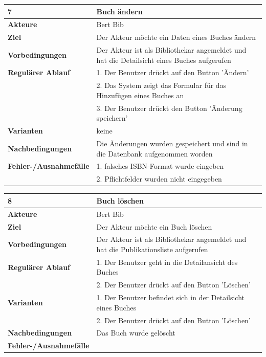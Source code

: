 \documentclass[fontsize=12pt,paper=a4,twoside]{scrartcl}
\begin{document}
\begin{table}[htbp]
\label{7}
\begin{tabular}{|l|p{10cm}|}
\hline 
\textbf{7} & \textbf{Buch ändern} \\ \hline
\textbf{Akteure} & Bert Bib\\ \hline
\textbf{Ziel} & Der Akteur möchte ein Daten eines Buches ändern \\ \hline
\textbf{Vorbedingungen} & Der Akteur ist als Bibliothekar angemeldet und hat die Detailsicht eines 
Buches aufgerufen  \\ \hline
\textbf{Regulärer Ablauf} & 
1. Der Benutzer drückt auf den Button 'Ändern' \\
&2. Das System zeigt das Formular für das Hinzufügen eines Buches an\\
&3. Der Benutzer drückt den Button 'Änderung speichern'\\
\hline
\textbf{Varianten} & 
keine \\ \hline
\textbf{Nachbedingungen} & Die Änderungen wurden gespeichert und sind in die Datenbank 
aufgenommen worden\\ \hline
\textbf{Fehler-/Ausnahmefälle} & 1. falsches ISBN-Format wurde eingeben\\
&2. Pflichtfelder wurden nicht eingegeben\\
\hline
\end{tabular}
\end{table}



\begin{table}[htbp]
\label{8}
\begin{tabular}{|l|p{10cm}|}
\hline 
\textbf{8} & \textbf{Buch löschen} \\ \hline
\textbf{Akteure} & Bert Bib\\ \hline
\textbf{Ziel} & Der Akteur möchte ein Buch löschen \\ \hline
\textbf{Vorbedingungen} & Der Akteur ist als Bibliothekar angemeldet und hat die Publikationsliste 
aufgerufen  \\ \hline
\textbf{Regulärer Ablauf} & 
1. Der Benutzer geht in die Detailansicht des  Buches\\
&2. Der Benutzer drückt auf den Button 'Löschen' \\
\hline
\textbf{Varianten} & 
1. Der Benutzer befindet sich in der Detailsicht eines Buches\\
&2. Der Benutzer drückt auf den Button 'Löschen' \\ \hline
\textbf{Nachbedingungen} & Das Buch wurde gelöscht \\ \hline
\textbf{Fehler-/Ausnahmefälle} & \\
\hline
\end{tabular}
\end{table}
\end{document}
